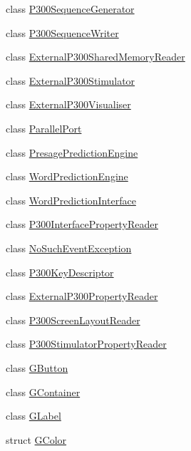 \begin{DoxyCompactItemize}
\item 
class \hyperlink{classOpenViBEApplications_1_1P300SequenceGenerator}{P300SequenceGenerator}
\item 
class \hyperlink{classOpenViBEApplications_1_1P300SequenceWriter}{P300SequenceWriter}
\item 
class \hyperlink{classOpenViBEApplications_1_1ExternalP300SharedMemoryReader}{ExternalP300SharedMemoryReader}
\item 
class \hyperlink{classOpenViBEApplications_1_1ExternalP300Stimulator}{ExternalP300Stimulator}
\item 
class \hyperlink{classOpenViBEApplications_1_1ExternalP300Visualiser}{ExternalP300Visualiser}
\item 
class \hyperlink{classOpenViBEApplications_1_1ParallelPort}{ParallelPort}
\item 
class \hyperlink{classOpenViBEApplications_1_1PresagePredictionEngine}{PresagePredictionEngine}
\item 
class \hyperlink{classOpenViBEApplications_1_1WordPredictionEngine}{WordPredictionEngine}
\item 
class \hyperlink{classOpenViBEApplications_1_1WordPredictionInterface}{WordPredictionInterface}
\item 
class \hyperlink{classOpenViBEApplications_1_1P300InterfacePropertyReader}{P300InterfacePropertyReader}
\item 
class \hyperlink{classOpenViBEApplications_1_1NoSuchEventException}{NoSuchEventException}
\item 
class \hyperlink{classOpenViBEApplications_1_1P300KeyDescriptor}{P300KeyDescriptor}
\item 
class \hyperlink{classOpenViBEApplications_1_1ExternalP300PropertyReader}{ExternalP300PropertyReader}
\item 
class \hyperlink{classOpenViBEApplications_1_1P300ScreenLayoutReader}{P300ScreenLayoutReader}
\item 
class \hyperlink{classOpenViBEApplications_1_1P300StimulatorPropertyReader}{P300StimulatorPropertyReader}
\item 
class \hyperlink{classOpenViBEApplications_1_1GButton}{GButton}
\item 
class \hyperlink{classOpenViBEApplications_1_1GContainer}{GContainer}
\item 
class \hyperlink{classOpenViBEApplications_1_1GLabel}{GLabel}
\item 
struct \hyperlink{structOpenViBEApplications_1_1GColor}{GColor}
\item 

\end{DoxyCompactItemize}
